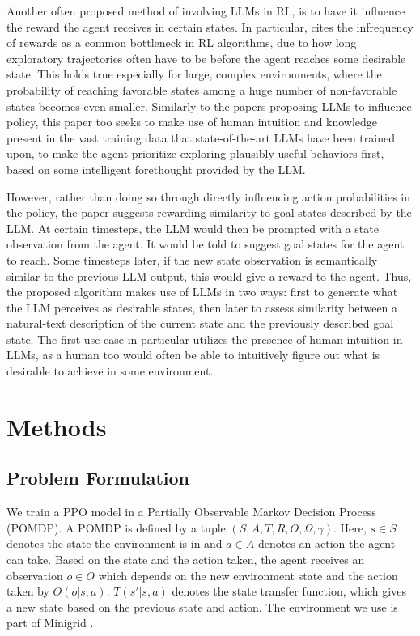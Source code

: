 \documentclass[conference]{IEEEtran}
\begin{document}
Another often proposed method of involving LLMs in RL, is to have it influence the reward the agent receives in certain states. In particular, \cite{ellm} cites the infrequency of rewards as a common bottleneck in RL algorithms, due to how long exploratory trajectories often have to be before the agent reaches some desirable state. This holds true especially for large, complex environments, where the probability of reaching favorable states among a huge number of non-favorable states becomes even smaller. Similarly to the papers proposing LLMs to influence policy, this paper too seeks to make use of human intuition and knowledge present in the vast training data that state-of-the-art LLMs have been trained upon, to make the agent prioritize exploring plausibly useful behaviors first, based on some intelligent forethought provided by the LLM.

However, rather than doing so through directly influencing action probabilities in the policy, the paper suggests rewarding similarity to goal states described by the LLM. At certain timesteps, the LLM would then be prompted with a state observation from the agent. It would be told to suggest goal states for the agent to reach. Some timesteps later, if the new state observation is semantically similar to the previous LLM output, this would give a reward to the agent. Thus, the proposed algorithm makes use of LLMs in two ways: first to generate what the LLM perceives as desirable states, then later to assess similarity between a natural-text description of the current state and the previously described goal state. The first use case in particular utilizes the presence of human intuition in LLMs, as a human too would often be able to intuitively figure out what is desirable to achieve in some environment.

\section{Methods}

\subsection{Problem Formulation}

We train a PPO model in a Partially Observable Markov Decision Process (POMDP). A POMDP is defined by a tuple $(S, A, T, R, O, \Omega, \gamma)$. Here, $s \in S$ denotes the state the environment is in and $a \in A$ denotes an action the agent can take. Based on the state and the action taken, the agent receives an observation $o \in O$ which depends on the new environment state and the action taken by $O(o | s, a)$. $T(s' | s, a)$ denotes the state transfer function, which gives a new state based on the previous state and action. The environment we use is part of Minigrid \cite{minigrid}.
\end{document}
